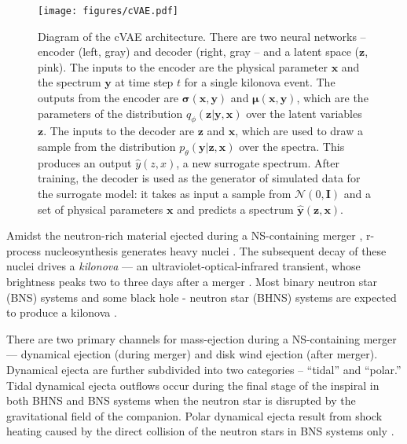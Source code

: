 \documentclass[fleqn,usenatbib,useAMS]{mnras}
\begin{document}
\begin{figure*}
    \centering
    \texttt{[image: figures/cVAE.pdf]}
    \caption{
    Diagram of the cVAE architecture. There are two neural networks -- encoder (left, gray) and  decoder (right, gray -- and a latent space ($\mathbf{z}$, pink). 
    The inputs to the encoder are the physical parameter  $\mathbf{x}$ and the spectrum $\mathbf{y}$ at time step $t$ for a single kilonova event. 
    The outputs from the encoder are  $\mathbf{\sigma}(\mathbf{x, y})$ and $\boldsymbol{\mu}(\mathbf{x, y})$, which are the parameters of the distribution $q_{\phi}(\mathbf{z}|\mathbf{y}, \mathbf{x})$ over the latent variables $\mathbf{z}$.
    The inputs to the decoder are $\mathbf{z}$ and $\mathbf{x}$, which are used to draw a sample from the distribution $p_{\theta}(\mathbf{y} | \mathbf{z},\mathbf{x})$ over the spectra. This produces an output $\hat{y}(z,x)$, a new surrogate spectrum. %
     After training, the decoder is used as the generator of simulated data for the surrogate model: it takes as input a sample from $\mathcal{N}(0, \mathbf{I})$ and a set of physical parameters $\mathbf{x}$ and predicts a spectrum $\hat{\mathbf{y}}(\mathbf{z}, \mathbf{x})$.
    }
    \label{fig:cvae}
    
\end{figure*}

Amidst the neutron-rich material ejected during a NS-containing merger \citep{lattimerBlackholeneutronstarCollisions1974,rosswogMassEjectionNeutron1998,metzgerElectromagneticCounterpartsCompact2010}, r-process nucleosynthesis generates heavy nuclei \citep{burbidgeSynthesisElementsStars1957,cameronNUCLEARREACTIONSSTARS1957}.
The subsequent decay of these nuclei drives a \emph{kilonova} --- an ultraviolet-optical-infrared transient, whose brightness peaks two to three days after a merger \citep{liTransientEventsNeutron1998}.
Most binary neutron star (BNS) systems and some black hole - neutron star (BHNS) systems are expected to produce a kilonova \citep{MetzgerKNHandbook}.

There are two primary channels for mass-ejection during a NS-containing merger \citep{MetzgerKNHandbook} --- dynamical ejection (during merger) and disk wind ejection (after merger).
Dynamical ejecta are further subdivided into two categories -- ``tidal'' and ``polar.''
Tidal dynamical ejecta outflows occur during the final stage of the inspiral in both BHNS and BNS systems when the neutron star is disrupted by the gravitational field of the companion.
Polar dynamical ejecta result from shock heating caused by the direct collision of the neutron stars in BNS systems only \citep[e.g.,][]{radiceBinaryNeutronStar2018}.
\end{document}
